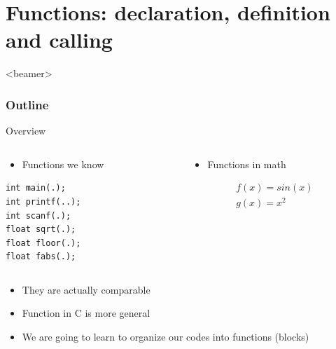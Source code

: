 \section{Functions: declaration, definition and calling}
\label{sec:func}
\begin{frame}<beamer>
    \frametitle{Outline}
    \tableofcontents[currentsection]
\end{frame}

\begin{frame}[fragile]{Overview}

\begin{columns}
\begin{column}{0.45\linewidth}
\begin{itemize}
	\item {Functions we know}
\end{itemize}
\begin{lstlisting}
int main(.);
int printf(..);
int scanf(.);
float sqrt(.);
float floor(.);
float fabs(.); 
\end{lstlisting}
\end{column}
\begin{column}{0.45\linewidth}
\begin{itemize}
	\item {Functions in math}
\end{itemize}
\begin{eqnarray}
f(x)=sin(x) \nonumber\\
g(x)=x^2 \nonumber
\end{eqnarray}
\end{column}
\end{columns}
\begin{itemize}
	\item {They are actually comparable}
	\item {Function in C is more general}
	\item {We are going to learn to organize our codes into functions (blocks)}
\end{itemize}
\end{frame}

